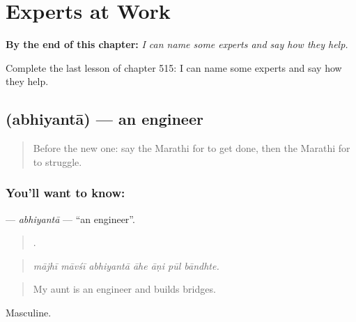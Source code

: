 
\chapter{Experts at Work}
\label{ch:mr-experts-at-work}

\begin{chapteropening}
\textbf{By the end of this chapter:} \emph{I can name some experts and say how they help.}

Complete the last lesson of chapter 515: I can name some experts and say how they help.
\end{chapteropening}

\section[\texorpdfstring{\mr{अभियंता} (abhiyantā)}{अभियंता (abhiyantā)}]{ (abhiyantā) — an engineer}

\label{lesson:MR-C515-abhiyanta}



\begin{quote}
Before the new one: say the Marathi for to get done, then the Marathi for to struggle.
\end{quote}

\subsection*{You'll want to know: }
\textbf{} — \emph{abhiyantā} — \textquotedblleft{}an engineer\textquotedblright{}.

\begin{quote}
      .
\end{quote}

\begin{quote}
\emph{mājhī māvśī abhiyantā āhe āṇi pūl bāndhte.}
\end{quote}

\begin{quote}
My aunt is an engineer and builds bridges.
\end{quote}

Masculine.

